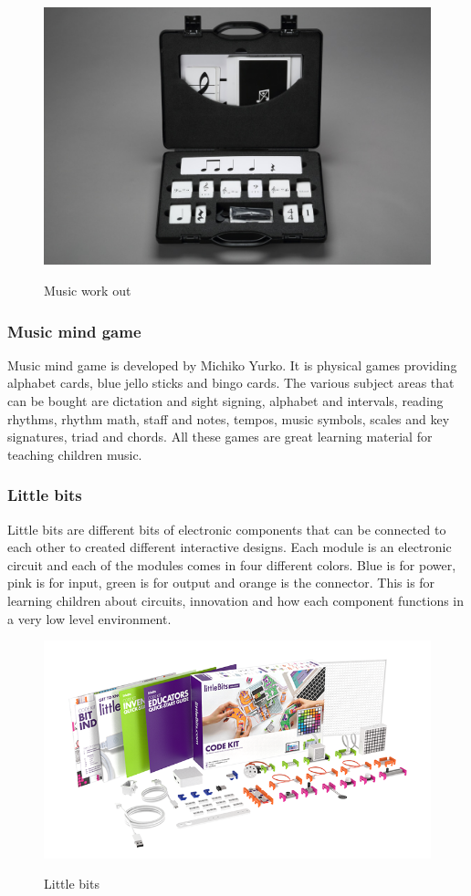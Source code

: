 \begin{figure}[H]
	\centering
	\includegraphics[width=0.7\linewidth]{figure/Analysis/musicworkout}
	\label{fig:musicworkout}
	\caption{Music work out}
\end{figure}

\subsubsection{Music mind game}
Music mind game is developed by Michiko Yurko. It is physical games providing alphabet cards, blue jello sticks and bingo cards. The various subject areas that can be bought are dictation and sight signing, alphabet and intervals, reading rhythms, rhythm math, staff and notes, tempos, music symbols, scales and key signatures, triad and chords. All these games are great learning material for teaching children music. 

\subsubsection{Little bits}
Little bits are different bits of electronic components that can be connected to each other to created different interactive designs. Each module is an electronic circuit and each of the modules comes in four different colors. Blue is for power, pink is for input, green is for output and orange is the connector. This is for learning children about circuits, innovation and how each component functions in a very low level environment. 

\begin{figure}[H]
	\centering
	\includegraphics[width=0.7\linewidth]{figure/Analysis/littlebits}
	\label{fig:littlebits}
	\caption{Little bits}
\end{figure}
  

